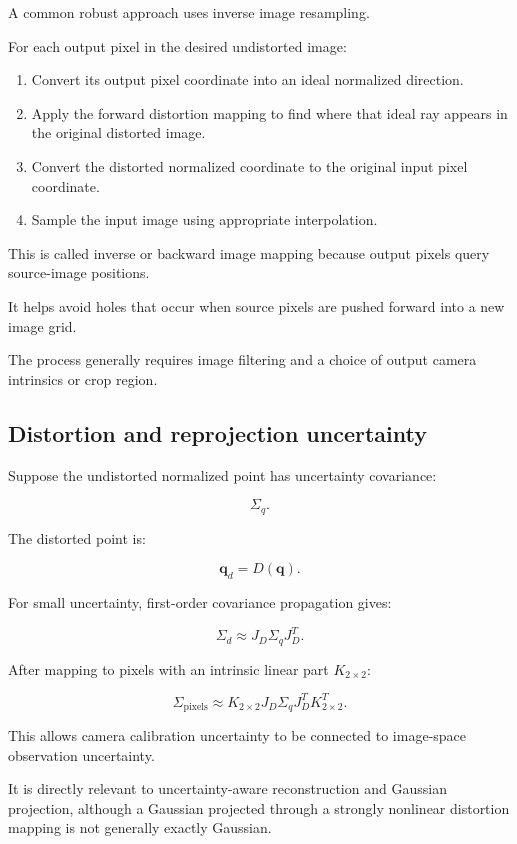 A common robust approach uses inverse image resampling.

For each output pixel in the desired undistorted image:

\begin{enumerate}
\def\labelenumi{\arabic{enumi}.}
\tightlist
\item
  Convert its output pixel coordinate into an ideal normalized direction.
\item
  Apply the forward distortion mapping to find where that ideal ray appears in the original distorted image.
\item
  Convert the distorted normalized coordinate to the original input pixel coordinate.
\item
  Sample the input image using appropriate interpolation.
\end{enumerate}

This is called inverse or backward image mapping because output pixels query source-image positions.

It helps avoid holes that occur when source pixels are pushed forward into a new image grid.

The process generally requires image filtering and a choice of output camera intrinsics or crop region.

\subsection{Distortion and reprojection uncertainty}\label{02-foundations-ii-ch035-distortion-and-reprojection-uncertainty}

Suppose the undistorted normalized point has uncertainty covariance:

\[
 \Sigma_q.
\]

The distorted point is:

\[
 \mathbf q_d=D(\mathbf q).
\]

For small uncertainty, first-order covariance propagation gives:

\[
 \boxed{ \Sigma_d\approx J_D\Sigma_qJ_D^T }.
\]

After mapping to pixels with an intrinsic linear part \(K_{2\times2}\):

\[
 \boxed{ \Sigma_{\mathrm{pixels}} \approx K_{2\times2} J_D\Sigma_qJ_D^T K_{2\times2}^T }.
\]

This allows camera calibration uncertainty to be connected to image-space observation uncertainty.

It is directly relevant to uncertainty-aware reconstruction and Gaussian projection, although a Gaussian projected through a strongly nonlinear distortion mapping is not generally exactly Gaussian.

